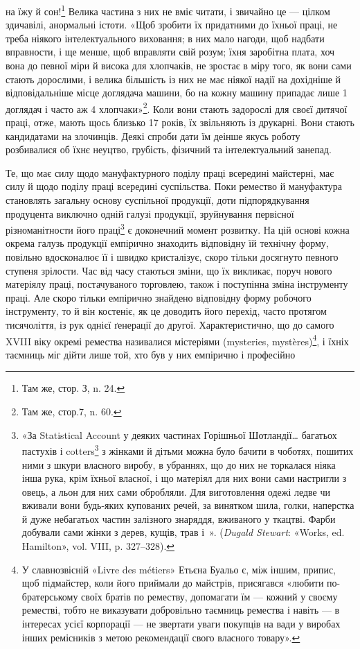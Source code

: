 \parcont{}  %
на їжу й сон!\footnote{
Там же, стор. З, n. 24.
} Велика частина з них не вміє читати, і звичайно
це — цілком здичавілі, анормальні істоти. «Щоб зробити їх
придатними до їхньої праці, не треба ніякого інтелектуального
виховання; в них мало нагоди, щоб надбати вправности, і ще
менше, щоб вправляти свій розум; їхня заробітна плата, хоч вона
до певної міри й висока для хлопчаків, не зростає в міру того, як
вони сами стають дорослими, і велика більшість із них не має
ніякої надії на дохідніше й відповідальніше місце доглядача
машини, бо на кожну машину припадає лише 1 доглядач і часто
аж 4 хлопчаки»\footnote{
Там же, стор.7, n. 60.
}. Коли вони стають задорослі для своєї
дитячої праці, отже, мають щось близько 17 років, їх звільняють
із друкарні. Вони стають кандидатами на злочинців. Деякі спроби
дати їм деінше якусь роботу розбивалися об їхнє неуцтво, грубість,
фізичний та інтелектуальний занепад.

Те, що має силу щодо мануфактурного поділу праці всередині
майстерні, має силу й щодо поділу праці всередині суспільства.
Поки ремество й мануфактура становлять загальну основу суспільної
продукції, доти підпорядкування продуцента виключно
одній галузі продукції, зруйнування первісної різноманітности
його праці\footnote{
«За Statistical Account у деяких частинах Горішньої Шотландії\dots{}
багатьох пастухів і cotters\footnote*{
селян. \emph{Ред.}
} з жінками й дітьми можна було бачити
в чоботях, пошитих ними з шкури власного виробу, в убраннях, що до
них не торкалася ніяка інша рука, крім їхньої власної, і що матеріял
для них вони сами настригли з овець, а льон для них сами обробляли.
Для виготовлення одежі ледве чи вживали вони будь-яких купованих
речей, за винятком шила, голки, наперстка й дуже небагатьох частин
залізного знаряддя, вживаного у ткацтві. Фарби добували сами жінки з
дерев, кущів, трав і~». (\emph{Dugald Stewart}: «Works, ed. Hamilton»,
vol. VIII, p. 327--328).
} є доконечний момент розвитку. На цій основі
кожна окрема галузь продукції емпірично знаходить відповідну
їй технічну форму, повільно вдосконалює її і швидко кристалізує,
скоро тільки досягнуто певного ступеня зрілости. Час від
часу стаються зміни, що їх викликає, поруч нового матеріялу
праці, постачуваного торговлею, також і поступінна зміна інструменту
праці. Але скоро тільки емпірично знайдено відповідну
форму робочого інструменту, то й він костеніє, як це доводить
його перехід, часто протягом тисячоліття, із рук однієї ґенерації
до другої. Характеристично, що до самого XVIII віку окремі
ремества називалися містеріями (mysteries, mystères)\footnote{
У славнозвісній «Livre des métiers» Етьєна Буальо є, між іншим,
припис, щоб підмайстер, коли його приймали до майстрів, присягався
«любити по-братерському своїх братів по реместву, допомагати їм —
кожний у своєму реместві, тобто не виказувати добровільно таємниць
ремества і навіть — в інтересах усієї корпорації — не звертати уваги
покупців на вади у виробах інших ремісників з метою рекомендації свого
власного товару».
}, і їхніх таємниць міг дійти лише той, хто був у них емпірично і професійно
\parbreak{}  %
